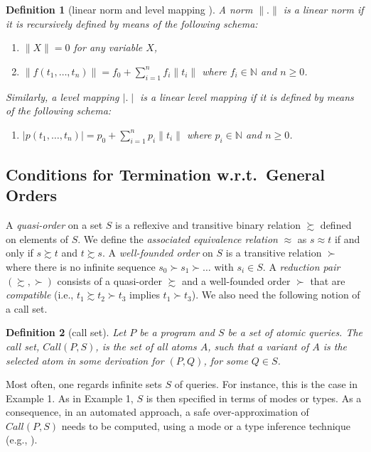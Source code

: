 \documentclass[envcountsame]{tlp}
\newcounter{ex:der-lastsymconsctr}
\newtheorem{definition}{Definition}
\begin{document}
\begin{definition}[linear norm and level mapping \cite{Serebrenik03}] \label{def:linearnorm}
A norm ${\parallel}.{\parallel}$ is a \emph{linear} norm if it is recursively defined by
means of the following schema:
\begin{enumerate}
\item[-]${\parallel}X{\parallel} = 0$ for any variable $X$,
\item[-]${\parallel}f(t_1,\ldots,t_n){\parallel} =
f_0 +\sum_{i=1}^{n}f_i{\parallel}t_i{\parallel}$ where $f_i \in \mathbb{N}$ and $n \ge
0$.
\end{enumerate}
Similarly, a level mapping ${\mid}.{\mid}$ is a \emph{linear} level mapping if it is
defined by means of the following schema:
\begin{enumerate}
\item[-]${\mid}p(t_1,\ldots,t_n){\mid} =
p_0 +\sum_{i=1}^{n}p_i{\parallel}t_i{\parallel}$ where $p_i \in \mathbb{N}$ and $n \ge 0$.
\end{enumerate}
\end{definition}
\subsection{Conditions for Termination w.r.t.\ General Orders}\label{subsec:conditions}

A
\emph{quasi-order} on a set $S$ is a reflexive and transitive binary relation
$\succsim$ defined on elements of $S$. We define the \emph{associated equivalence
relation} $\approx$ as $s \approx t$ if and only if $s \succsim t$ and $t \succsim
s$.
A \emph{well-founded order} on $S$ is a transitive relation $\succ$ where there is no
infinite sequence $s_0 \succ s_1 \succ \ldots$ with $s_i \in S$. A \emph{reduction pair}
$(\succsim,\succ)$ consists of a quasi-order $\succsim$ and a well-founded order $\succ$
that are \emph{compatible} (i.e., $t_1 \succsim t_2 \succ t_3$ implies $t_1 \succ
t_3$).
We also need the following notion of a call set.

\begin{definition}[call set]\label{def:callset}
Let $\mathit{P}$ be a program and $\mathit{S}$ be a set of atomic queries. The \emph{call
set}, $\mathit{Call}(P,S)$, is the set of all atoms $\mathit{A}$, such that a variant of
$\mathit{A}$ is the selected atom in some derivation for $\mathit{(P,Q)}$, for some $Q
\in S$.
\end{definition}

Most often, one regards infinite sets $\mathit{S}$ of queries. For instance,
this is the case in Example 1. As in Example 1, $\mathit{S}$ is then specified in 
terms of modes or types. As a consequence, in an automated approach, a safe over-approximation
of $\mathit{Call}(P,S)$ needs to be computed, using a mode or a type inference
technique (e.g.,
\cite{Bruynoogheetal05,GallagherHB05,HeatonACK00,Janssensetal92}).
\end{document}
